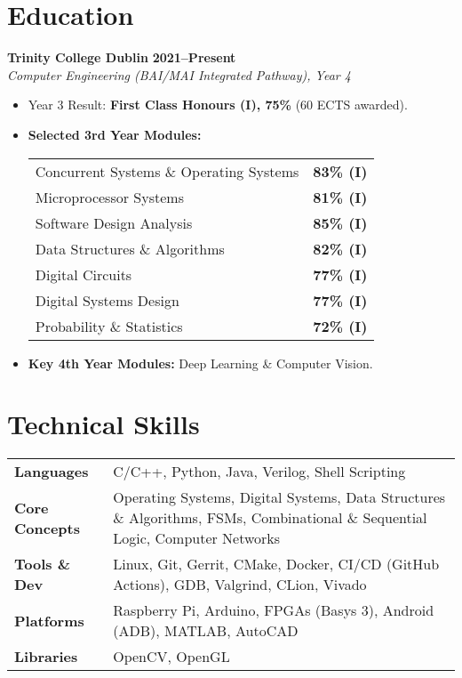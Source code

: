 \documentclass[10pt,a4paper]{article}
\begin{document}
\section*{Education}
\textbf{Trinity College Dublin} \hfill \textbf{2021--Present} \\
\textit{Computer Engineering (BAI/MAI Integrated Pathway), Year 4}
\begin{itemize}
    \item Year 3 Result: \textbf{First Class Honours (I), 75\%} (60 ECTS awarded).
    \item \textbf{Selected 3rd Year Modules:} \\
        \begin{tabularx}{\linewidth}{@{} X r @{}}
            Concurrent Systems \& Operating Systems & \textbf{83\% (I)} \\
            Microprocessor Systems & \textbf{81\% (I)} \\
            Software Design Analysis & \textbf{85\% (I)} \\
            Data Structures \& Algorithms & \textbf{82\% (I)} \\
            Digital Circuits & \textbf{77\% (I)} \\
            Digital Systems Design & \textbf{77\% (I)} \\
            Probability \& Statistics & \textbf{72\% (I)} \\
        \end{tabularx}
    \item \textbf{Key 4th Year Modules:} Deep Learning \& Computer Vision.
\end{itemize}


\section*{Technical Skills}
\begin{tabularx}{\textwidth}{@{} l >{\raggedright\arraybackslash}X @{}}
    \textbf{Languages}      & C/C++, Python, Java, Verilog, Shell Scripting \\
    \textbf{Core Concepts}  & Operating Systems, Digital Systems, Data Structures \& Algorithms, FSMs, Combinational \& Sequential Logic, Computer Networks \\
    \textbf{Tools \& Dev}   & Linux, Git, Gerrit, CMake, Docker, CI/CD (GitHub Actions), GDB, Valgrind, CLion, Vivado \\
    \textbf{Platforms}      & Raspberry Pi, Arduino, FPGAs (Basys 3), Android (ADB), MATLAB, AutoCAD \\
    \textbf{Libraries}      & OpenCV, OpenGL \\
\end{tabularx}
\end{document}
